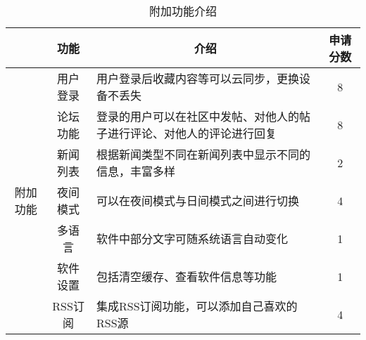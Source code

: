 \begin{table}[H]
	\centering
\begin{tabular}{|c|c|p{8cm}|c|}
    \hline
    \multicolumn{1}{|l|}{} & 功能   & \multicolumn{1}{c|}{介绍}    & 申请分数 \\ \hline
    \multirow{7}{*}{附加功能}     & 用户登录 & 用户登录后收藏内容等可以云同步，更换设备不丢失 & 8 \\ \cline{2-4} 
& 论坛功能 & 登录的用户可以在社区中发帖、对他人的帖子进行评论、对他人的评论进行回复 & 8 \\ \cline{2-4} 
& 新闻列表 & 根据新闻类型不同在新闻列表中显示不同的信息，丰富多样 & 2 \\ \cline{2-4} 
& 夜间模式 & 可以在夜间模式与日间模式之间进行切换 & 4 \\ \cline{2-4} 
& 多语言 & 软件中部分文字可随系统语言自动变化 & 1 \\ \cline{2-4} 
& 软件设置 & 包括清空缓存、查看软件信息等功能 & 1 \\ \cline{2-4} 
& RSS订阅 & 集成RSS订阅功能，可以添加自己喜欢的RSS源 & 4 \\ \hline
    \end{tabular}
	\caption{附加功能介绍}
\end{table}